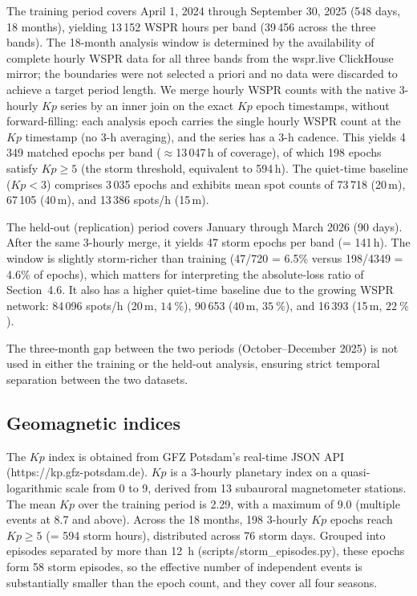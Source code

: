 \documentclass{agujournal2019}
\begin{document}
The training period covers April 1, 2024 through September 30, 2025
(548 days, 18 months), yielding 13\,152 WSPR hours per band
(39\,456 across the three bands). The 18-month analysis window is
determined by the availability of complete hourly WSPR data for all
three bands from the wspr.live ClickHouse mirror; the boundaries were
not selected a priori and no data were discarded to achieve a target
period length. We merge hourly WSPR counts with the native 3-hourly
$Kp$ series by an inner join on the exact $Kp$ epoch timestamps,
without forward-filling: each analysis epoch carries the single
hourly WSPR count at the $Kp$ timestamp (no 3-h averaging), and the
series has a 3-h cadence. This yields 4\,349 matched epochs per band
($\approx$13\,047\,h of
coverage), of which 198 epochs satisfy $Kp \ge 5$ (the storm
threshold, equivalent to 594\,h). The quiet-time baseline ($Kp < 3$)
comprises 3\,035 epochs and exhibits mean spot counts of 73\,718
(20\,m), 67\,105 (40\,m), and 13\,386 spots/h (15\,m).

The held-out (replication) period covers January through March 2026 (90 days).
After the same 3-hourly merge, it yields 47 storm epochs per band
(= 141\,h). The window is slightly storm-richer than training
(47/720 = 6.5\% versus 198/4349 = 4.6\% of epochs), which matters for
interpreting the absolute-loss ratio of Section~4.6. It also has a higher
quiet-time baseline due to the growing WSPR
network: 84\,096 spots/h
(20\,m, $\SI{+14}{\percent}$), 90\,653 (40\,m, $\SI{+35}{\percent}$),
and 16\,393 (15\,m, $\SI{+22}{\percent}$).

The three-month gap between the two periods (October--December 2025) is not
used in either the training or the held-out analysis, ensuring strict temporal
separation between the two datasets.

\subsection{Geomagnetic indices}

The $Kp$ index is obtained from GFZ Potsdam's real-time JSON API
(https://kp.gfz-potsdam.de). $Kp$ is a 3-hourly planetary index on a
quasi-logarithmic scale from 0 to 9, derived from 13 subauroral magnetometer
stations. The mean $Kp$ over the training period is 2.29, with a maximum
of 9.0 (multiple events at 8.7 and above). Across the 18 months, 198 3-hourly $Kp$
epochs reach $Kp \ge 5$ (= 594 storm hours), distributed across 76
storm days. Grouped into episodes separated by more than 12~h
(scripts/storm\_episodes.py), these epochs form 58 storm episodes, so
the effective number of independent events is substantially smaller
than the epoch count, and they cover all four seasons.
\end{document}
